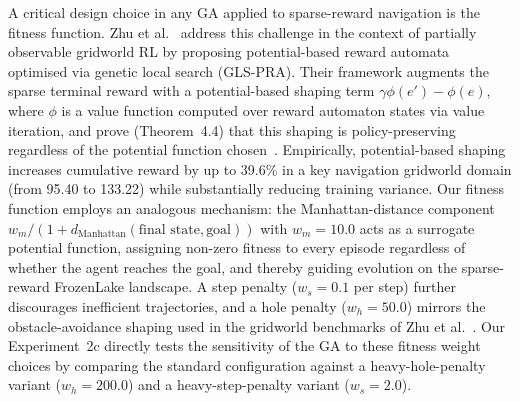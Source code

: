 \documentclass[conference]{IEEEtran}
\begin{document}
A critical design choice in any GA applied to sparse-reward
navigation is the fitness function.
Zhu et al.~\cite{b5} address this challenge in the context
of partially observable gridworld RL by proposing potential-based
reward automata optimised via genetic local search (GLS-PRA).
Their framework augments the sparse terminal reward with a
potential-based shaping term $\gamma\phi(e') - \phi(e)$,
where $\phi$ is a value function computed over reward automaton
states via value iteration, and prove (Theorem~4.4) that this
shaping is policy-preserving regardless of the potential
function chosen~\cite{b5}.
Empirically, potential-based shaping increases cumulative
reward by up to 39.6\% in a key navigation gridworld domain
(from 95.40 to 133.22) while substantially reducing training
variance.
Our fitness function employs an analogous mechanism: the
Manhattan-distance component
$w_m / (1 + d_\mathrm{Manhattan}(\text{final state}, \text{goal}))$
with $w_m = 10.0$ acts as a surrogate potential function,
assigning non-zero fitness to every episode regardless of
whether the agent reaches the goal, and thereby guiding
evolution on the sparse-reward FrozenLake landscape.
A step penalty ($w_s = 0.1$ per step) further discourages
inefficient trajectories, and a hole penalty ($w_h = 50.0$)
mirrors the obstacle-avoidance shaping used in the gridworld
benchmarks of Zhu et al.~\cite{b5}.
Our Experiment~2c directly tests the sensitivity of the GA
to these fitness weight choices by comparing the standard
configuration against a heavy-hole-penalty variant
($w_h = 200.0$) and a heavy-step-penalty variant
($w_s = 2.0$).
\end{document}
